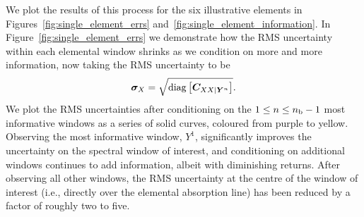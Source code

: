 \documentclass[a4paper,fleqn,usenatbib]{mnras}
\newcommand{\nb}{n_{\rm b}}
\newcommand{\condcov}{{\bm C}}
\begin{document}
We plot the results of this process for the six illustrative elements in Figures~\ref{fig:single_element_errs} and~\ref{fig:single_element_information}. In Figure~\ref{fig:single_element_errs} we demonstrate how the RMS uncertainty within each elemental window shrinks as we condition on more and more information, now taking the RMS uncertainty to be
\begin{equation}
\bm{\sigma}_X = \sqrt{{\rm diag} \left[\condcov_{XX|\bm{Y}^n}\right]}.
\end{equation}
We plot the RMS uncertainties after conditioning on the $1 \le n \le \nb-1$ most informative windows as a series of solid curves, coloured from purple to yellow. Observing the most informative window, $Y^1$, significantly improves the uncertainty on the spectral window of interest, and conditioning on additional windows continues to add information, albeit with diminishing returns. After observing all other windows, the RMS uncertainty at the centre of the window of interest (i.e., directly over the elemental absorption line) has been reduced by a factor of roughly two to five.
\end{document}
